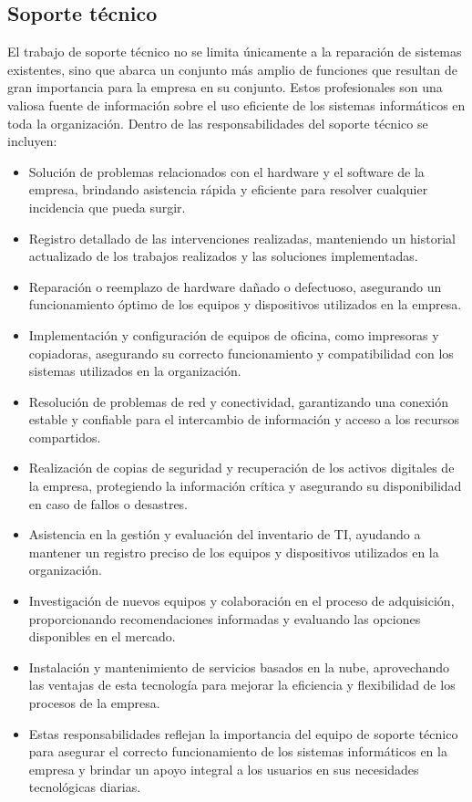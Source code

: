 \documentclass{article}
\begin{document}
\subsection{Soporte técnico}
El trabajo de soporte técnico no se limita únicamente a la reparación de sistemas existentes, sino que abarca un conjunto más amplio de funciones que resultan de gran importancia para la empresa en su conjunto. Estos profesionales son una valiosa fuente de información sobre el uso eficiente de los sistemas informáticos en toda la organización.
Dentro de las responsabilidades del soporte técnico se incluyen:
\begin{itemize}[label=$\circ$]
    \item Solución de problemas relacionados con el hardware y el software de la empresa, brindando asistencia rápida y eficiente para resolver cualquier incidencia que pueda surgir.
    \item Registro detallado de las intervenciones realizadas, manteniendo un historial actualizado de los trabajos realizados y las soluciones implementadas.
    \item Reparación o reemplazo de hardware dañado o defectuoso, asegurando un funcionamiento óptimo de los equipos y dispositivos utilizados en la empresa.
    \item Implementación y configuración de equipos de oficina, como impresoras y copiadoras, asegurando su correcto funcionamiento y compatibilidad con los sistemas utilizados en la organización.
    \item Resolución de problemas de red y conectividad, garantizando una conexión estable y confiable para el intercambio de información y acceso a los recursos compartidos.
    \item Realización de copias de seguridad y recuperación de los activos digitales de la empresa, protegiendo la información crítica y asegurando su disponibilidad en caso de fallos o desastres.
    \item Asistencia en la gestión y evaluación del inventario de TI, ayudando a mantener un registro preciso de los equipos y dispositivos utilizados en la organización.
    \item Investigación de nuevos equipos y colaboración en el proceso de adquisición, proporcionando recomendaciones informadas y evaluando las opciones disponibles en el mercado.
    \item Instalación y mantenimiento de servicios basados en la nube, aprovechando las ventajas de esta tecnología para mejorar la eficiencia y flexibilidad de los procesos de la empresa.
    \item Estas responsabilidades reflejan la importancia del equipo de soporte técnico para asegurar el correcto funcionamiento de los sistemas informáticos en la empresa y brindar un apoyo integral a los usuarios en sus necesidades tecnológicas diarias.    
\end{itemize}
\end{document}

